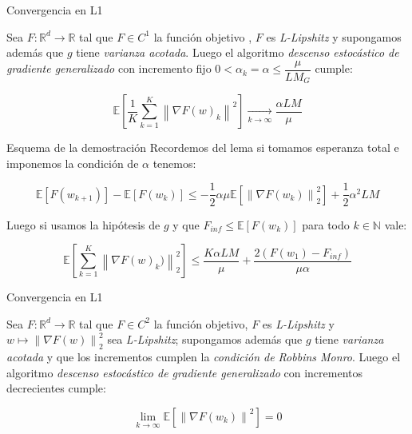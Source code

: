\documentclass{beamer}
\newcommand{\R}{{\mathbb{R}}}
\newcommand{\N}{{\mathbb{N}}}
\newcommand{\norm}[1]{\left\lVert#1\right\rVert}
\newcommand{\expectation}[1]{\mathbb{E} \left[#1\right]}
\newcommand{\underlimitinf}[1]{\xrightarrow[#1 \rightarrow \infty]{}}
\begin{document}
\begin{frame}{Convergencia en L1}
\begin{theorem}
	Sea $F: \R^d \rightarrow \R$ tal que $F \in C^1$ la funci\'on objetivo , $F$ es \textit{L-Lipshitz} y supongamos adem\'as que $g$ tiene \textit{varianza acotada}. Luego el algoritmo \textit{descenso estoc\'astico de gradiente generalizado} con incremento fijo $0  < \alpha_k = \alpha \leq \dfrac{\mu}{LM_G} $ cumple:
	
	\begin{equation*}
	\expectation{\dfrac{1}{K}\sum\limits_{k=1}^{K} {\norm{\nabla F (w)_k}^2}} \underlimitinf{k}  \dfrac{\alpha LM}{\mu}
	\end{equation*}
	
\end{theorem}
\end{frame}

\begin{frame}{Esquema de la demostraci\'on}
	Recordemos del lema si tomamos esperanza total e imponemos la condici\'on de $\alpha$ tenemos:

\begin{equation*}
\expectation{F(w_{k+1})} - \expectation{F(w_k)}  \leq  - \frac{1}{2}\alpha \mu \expectation{\norm{\nabla F(w_k)}_2^2} + \frac{1}{2} \alpha^2 LM
\end{equation*}

Luego si usamos la hip\'otesis de $g$ y que $F_{inf} \leq \expectation{F(w_k)}$ para todo $k \in \N$ vale:

\begin{equation*}
		\expectation{\sum\limits_{k=1}^{K} {\norm{\nabla F (w)_k)}_2^2}} \leq \dfrac{K \alpha LM}{\mu} + \dfrac{2(F(w_1) - F_{inf})}{\mu \alpha}
\end{equation*}
\end{frame}

\begin{frame}{Convergencia en L1}
\begin{theorem}
	Sea $F: \R^d \rightarrow \R$ tal que $F \in C^2$ la funci\'on objetivo, $F$ es \textit{L-Lipshitz} y $w \mapsto \norm{\nabla F (w)}_2^2$ sea \textit{L-Lipshitz}; supongamos adem\'as que $g$ tiene \textit{varianza acotada} y que los incrementos cumplen la \textit{condici\'on de Robbins Monro}. Luego el algoritmo \textit{descenso estoc\'astico de gradiente generalizado} con incrementos decrecientes cumple:
	
	\begin{equation*}
	\lim\limits_{k \rightarrow \infty} \expectation{\norm{\nabla F (w_k)}^2} = 0
	\end{equation*}
	
\end{theorem}
\end{frame}
\end{document}
